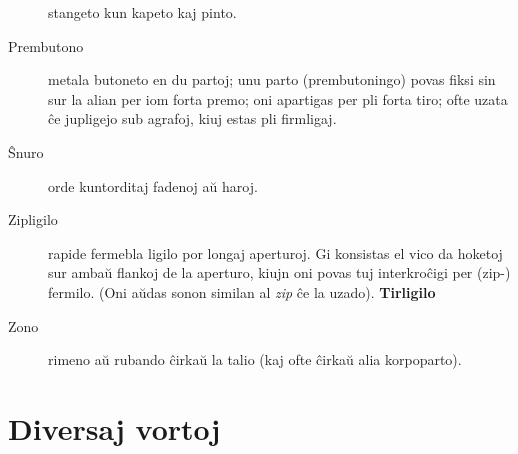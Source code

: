 \begin{description}
 stangeto kun kapeto kaj pinto.

\item[Prembutono]

 metala butoneto en du partoj; unu parto (prembutoningo) povas fiksi sin sur la alian per iom forta premo; oni apartigas per pli forta tiro; ofte uzata ĉe jupligejo sub agrafoj, kiuj estas pli firmligaj.

\item[Ŝnuro]

 orde kuntorditaj fadenoj aŭ haroj.

\item[\ast\space Zipligilo]

 rapide fermebla ligilo por longaj aperturoj. Gi konsistas el vico da hoketoj sur ambaŭ flankoj de la aperturo, kiujn oni povas tuj interkroĉigi per (zip-) fermilo. (Oni aŭdas sonon similan al \emph{zip} ĉe la uzado). \textbf{Tirligilo}

\item[Zono]

 rimeno aŭ rubando ĉirkaŭ la talio (kaj ofte ĉirkaŭ alia korpoparto).
\end{description}

\section[Diversaj vortoj]{Diversaj vortoj}
\hypertarget{Diversaj vortoj}{}
\label{Diversaj vortoj}



